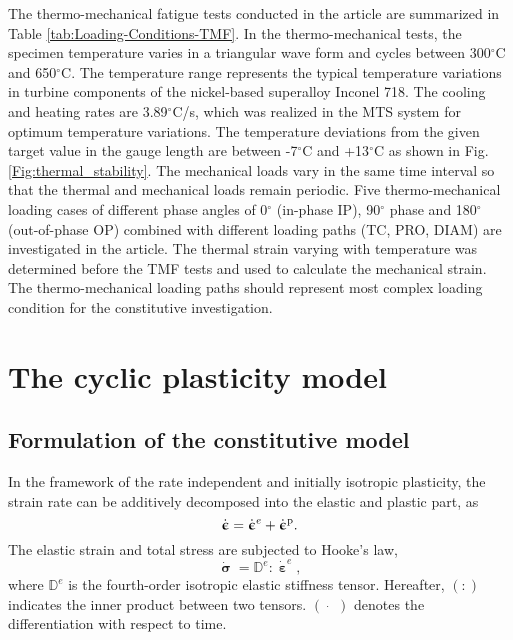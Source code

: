 \documentclass[preprint,5p,twocolumn,11pt,sort&compress]{elsarticle}
\newcommand{\bfsigma}{{\bm{\upsigma}}}
\newcommand{\dotbfepsilon}{{\dot{\bm{\upepsilon}}}}
\newcommand{\bfepsilon}{{\bm{\upepsilon}}}
\begin{document}
The thermo-mechanical fatigue tests conducted in the article are summarized in Table \ref{tab:Loading-Conditions-TMF}.
In the thermo-mechanical tests, the specimen temperature varies in a triangular wave form and cycles between 300$^{\circ}$C and 650$^{\circ}$C. The temperature range represents the typical temperature variations in turbine components of the nickel-based superalloy Inconel 718. The cooling and heating rates are 3.89$^{\circ}$C/s, which was realized in the MTS system for optimum temperature variations.  The temperature deviations from the given target value in the gauge length are between -7$^{\circ}$C and +13$^{\circ}$C as shown in Fig. \ref{Fig:thermal_stability}. The mechanical loads vary in the same time interval so that the thermal and mechanical loads remain periodic.  Five thermo-mechanical loading cases of different phase angles of 0$^{\circ}$ (in-phase IP), 90$^{\circ}$ phase and 180$^{\circ}$ (out-of-phase OP) combined with different loading paths (TC, PRO, DIAM) are investigated in the article.
The thermal strain varying with temperature was determined before the TMF tests and used to calculate the mechanical strain. The thermo-mechanical loading paths should represent most complex loading condition for the constitutive investigation.


\section{The cyclic plasticity model}

\subsection{Formulation of the constitutive model}
\noindent
In the framework of the rate independent and initially isotropic plasticity, the strain rate can be additively decomposed into the elastic and plastic  part, as
\begin{equation}
\dotbfepsilon = {\dotbfepsilon}^e + {\dotbfepsilon}^{\rm p}.
\end{equation}
The elastic strain and total stress are subjected to Hooke's law,
\begin{equation}
{\dot\bfsigma} = {\mathbb{D}^e}:{\dot\bfepsilon^e},
\label{Equ:HookesLaw}
\end{equation}
where ${\mathbb{D}^e}$ is the fourth-order isotropic elastic stiffness tensor. Hereafter, $(:)$ indicates the inner product between two tensors. $(\dot{\quad})$ denotes the differentiation with respect to time.
\end{document}
